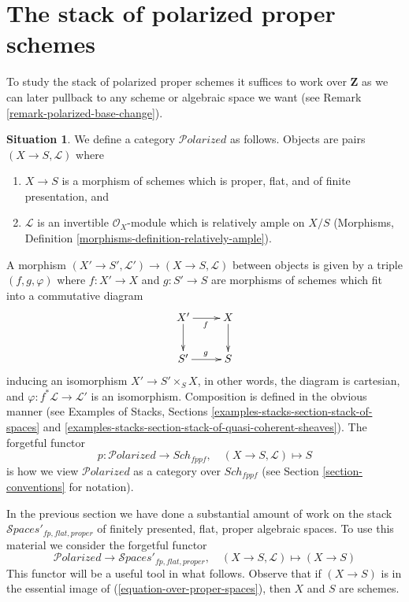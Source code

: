 \documentclass{stacks-project}
\theoremstyle{plain}
\theoremstyle{definition}
\newtheorem{situation}[subsection]{Situation}
\theoremstyle{remark}
\numberwithin{equation}{subsection}
\def\Sch{\mathit{Sch}}
\def\Spacesstack{\mathcal{S}\!\mathit{paces}}
\def\Polarizedstack{\mathcal{P}\!\mathit{olarized}}
\begin{document}
\section{The stack of polarized proper schemes}
\label{section-polarized}

\noindent
To study the stack of polarized proper schemes it suffices to work
over $\mathbf{Z}$ as we can later pullback to any scheme or algebraic
space we want (see Remark \ref{remark-polarized-base-change}).

\begin{situation}
\label{situation-polarized}
We define a category $\Polarizedstack$ as follows. Objects are
pairs $(X \to S, \mathcal{L})$ where
\begin{enumerate}
\item $X \to S$ is a morphism of schemes which is proper, flat, and
of finite presentation, and
\item $\mathcal{L}$ is an invertible $\mathcal{O}_X$-module
which is relatively ample on $X/S$
(Morphisms, Definition \ref{morphisms-definition-relatively-ample}).
\end{enumerate}
A morphism $(X' \to S', \mathcal{L}') \to (X \to S, \mathcal{L})$
between objects
is given by a triple $(f, g, \varphi)$ where $f : X' \to X$ and $g : S' \to S$
are morphisms of schemes which fit into a commutative diagram
$$
\xymatrix{
X' \ar[d] \ar[r]_f & X \ar[d] \\
S' \ar[r]^g & S
}
$$
inducing an isomorphism $X' \to S' \times_S X$, in other words, the
diagram is cartesian,
and $\varphi : f^*\mathcal{L} \to \mathcal{L}'$ is an isomorphism.
Composition is defined in the obvious manner (see
Examples of Stacks, Sections
\ref{examples-stacks-section-stack-of-spaces} and
\ref{examples-stacks-section-stack-of-quasi-coherent-sheaves}).
The forgetful functor
$$
p : \Polarizedstack \longrightarrow \Sch_{fppf},\quad
(X \to S, \mathcal{L}) \longmapsto S
$$
is how we view $\Polarizedstack$ as a category over $\Sch_{fppf}$
(see Section \ref{section-conventions} for notation).
\end{situation}

\noindent
In the previous section we have done a substantial amount of work on the stack
$\Spacesstack'_{fp, flat, proper}$
of finitely presented, flat, proper algebraic spaces. To use this material
we consider the forgetful functor
\begin{equation}
\label{equation-over-proper-spaces}
\Polarizedstack \longrightarrow
\Spacesstack'_{fp, flat, proper},\quad
(X \to S, \mathcal{L}) \longmapsto (X \to S)
\end{equation}
This functor will be a useful tool in what follows.
Observe that if $(X \to S)$ is in the essential image
of (\ref{equation-over-proper-spaces}), then
$X$ and $S$ are schemes.
\end{document}
